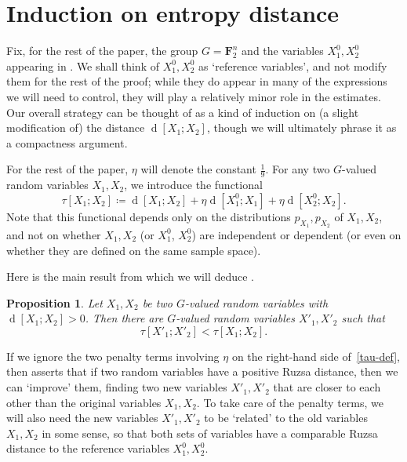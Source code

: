 \documentclass[12pt,reqno,tbtags]{amsart}
\newtheorem{proposition}[theorem]{Proposition}
\theoremstyle{definition}
\theoremstyle{remark}
\def\F{\mathbf{F}}
\newcommand{\dist}[2]{{\operatorname{d}[#1;#2]}} %
\numberwithin{equation}{section}
\begin{document}
\section{Induction on entropy distance}\label{sec2}

Fix, for the rest of the paper, the group $G = \F_2^n$ and the variables $X^0_1, X^0_2$ appearing in . We shall think of $X^0_1, X^0_2$ as `reference variables', and not modify them for the rest of the proof; while they do appear in many of the expressions we will need to control, they will play a relatively minor role in the estimates.
 Our overall strategy can be thought of as a kind of induction on (a slight modification of) the distance $\dist{X_1}{X_2}$, though we will ultimately phrase it as a compactness argument.

For the rest of the paper, $\eta$ will denote the constant $\frac{1}{9}$. For any two $G$-valued random variables $X_1, X_2$, we introduce the functional
\begin{equation}\label{tau-def}
  \tau[X_1; X_2] \coloneqq \dist{X_1}{X_2} + \eta  \dist{X^0_1}{X_1} + \eta \dist{X^0_2}{X_2}.
\end{equation}
Note that this functional depends only on the distributions $p_{X_1}, p_{X_2}$ of $X_1,X_2$, and not on whether $X_1,X_2$ (or $X_1^0$, $X^0_2$) are independent or dependent (or even on whether they are defined on the same sample space).

Here is the main result from which we will deduce .

\begin{proposition}\label{de-prop}
  Let $X_1, X_2$ be two $G$-valued random variables with $\dist{X_1}{X_2} > 0$. Then there are $G$-valued random variables $X'_1, X'_2$ such that
\begin{equation}
\label{d-opt} \tau[X'_1;X'_2] < \tau[X_1;X_2].
\end{equation}
\end{proposition}

If we ignore the two penalty terms involving $\eta$ on the right-hand side of~\eqref{tau-def}, then  asserts that if two random variables have a positive Ruzsa distance, then we can `improve' them, finding two new variables $X'_1, X'_2$ that are closer to each other than the original variables $X_1,X_2$.  To take care of the penalty terms, we will also need the new variables $X'_1,X'_2$ to be `related' to the old variables $X_1,X_2$ in some sense, so that both sets of variables have a comparable Ruzsa distance to the reference variables $X^0_1, X^0_2$.
\end{document}
